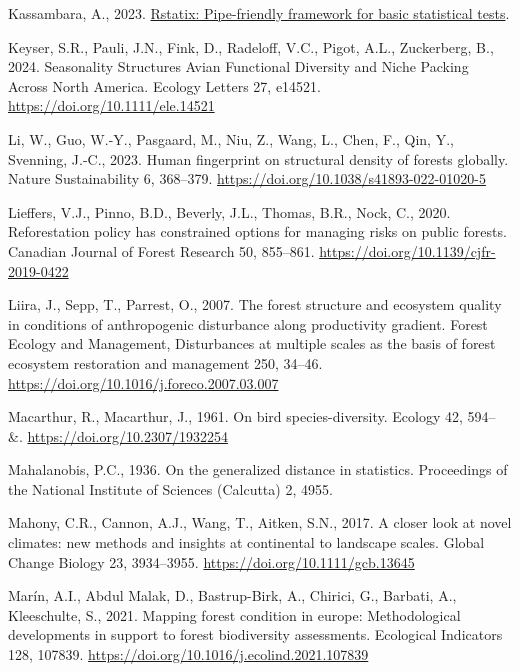 \documentclass[
]{agujournal2019}
\newlength{\cslhangindent}
\newenvironment{CSLReferences}[2] %
 {\begin{list}{}{%
  \setlength{\itemindent}{0pt}
  \setlength{\leftmargin}{0pt}
  \setlength{\parsep}{0pt}
  \ifodd #1
   \setlength{\leftmargin}{\cslhangindent}
   \setlength{\itemindent}{-1\cslhangindent}
  \fi
  \setlength{\itemsep}{#2\baselineskip}}}
 {\end{list}}
\begin{document}
\begin{CSLReferences}{1}{0}
Kassambara, A., 2023.
\href{https://rpkgs.datanovia.com/rstatix/}{Rstatix: Pipe-friendly
framework for basic statistical tests}.

Keyser, S.R., Pauli, J.N., Fink, D., Radeloff, V.C., Pigot, A.L.,
Zuckerberg, B., 2024. Seasonality Structures Avian Functional Diversity
and Niche Packing Across North America. Ecology Letters 27, e14521.
\url{https://doi.org/10.1111/ele.14521}

Li, W., Guo, W.-Y., Pasgaard, M., Niu, Z., Wang, L., Chen, F., Qin, Y.,
Svenning, J.-C., 2023. Human fingerprint on structural density of
forests globally. Nature Sustainability 6, 368--379.
\url{https://doi.org/10.1038/s41893-022-01020-5}

Lieffers, V.J., Pinno, B.D., Beverly, J.L., Thomas, B.R., Nock, C.,
2020. Reforestation policy has constrained options for managing risks on
public forests. Canadian Journal of Forest Research 50, 855--861.
\url{https://doi.org/10.1139/cjfr-2019-0422}

Liira, J., Sepp, T., Parrest, O., 2007. The forest structure and
ecosystem quality in conditions of anthropogenic disturbance along
productivity gradient. Forest Ecology and Management, Disturbances at
multiple scales as the basis of forest ecosystem restoration and
management 250, 34--46.
\url{https://doi.org/10.1016/j.foreco.2007.03.007}

Macarthur, R., Macarthur, J., 1961. On bird species-diversity. Ecology
42, 594-- \&. \url{https://doi.org/10.2307/1932254}

Mahalanobis, P.C., 1936. On the generalized distance in statistics.
Proceedings of the National Institute of Sciences (Calcutta) 2, 4955.

Mahony, C.R., Cannon, A.J., Wang, T., Aitken, S.N., 2017. A closer look
at novel climates: new methods and insights at continental to landscape
scales. Global Change Biology 23, 3934--3955.
\url{https://doi.org/10.1111/gcb.13645}

Marín, A.I., Abdul Malak, D., Bastrup-Birk, A., Chirici, G., Barbati,
A., Kleeschulte, S., 2021. Mapping forest condition in europe:
Methodological developments in support to forest biodiversity
assessments. Ecological Indicators 128, 107839.
\url{https://doi.org/10.1016/j.ecolind.2021.107839}


\end{CSLReferences}
\end{document}
